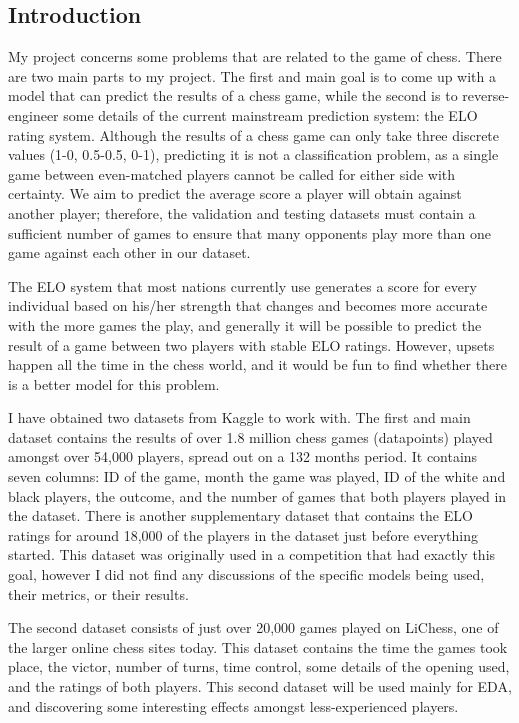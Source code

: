 \documentclass[12pt, letterpaper]{article}
\begin{document}
\begin{multicols}{2}
\raggedcolumns
\subsection*{Introduction}

My project concerns some problems that are related to the game of chess. There are two main parts to my project. The first and main goal is to come up with a model that can predict the results of a chess game, while the second is to reverse-engineer some details of the current mainstream prediction system: the ELO rating system.
Although the results of a chess game can only take three discrete values (1-0, 0.5-0.5, 0-1), predicting it is not a classification problem, as a single game between even-matched players cannot be called for either side with certainty. We aim to predict the average score a player will obtain against another player; therefore, the validation and testing datasets must contain a sufficient number of games to ensure that many opponents play more than one game against each other in our dataset.

The ELO system that most nations currently use generates a score for every individual based on his/her strength that changes and becomes more accurate with the more games the play, and generally it will be possible to predict the result of a game between two players with stable ELO ratings. However, upsets happen all the time in the chess world, and it would be fun to find whether there is a better model for this problem.

I have obtained two datasets from Kaggle to work with. The first and main dataset contains the results of over 1.8 million chess games (datapoints) played amongst over 54,000 players, spread out on a 132 months period. It contains seven columns: ID of the game, month the game was played, ID of the white and black players, the outcome, and the number of games that both players played in the dataset. There is another supplementary dataset that contains the ELO ratings for around 18,000 of the players in the dataset just before everything started. This dataset was originally used in a competition that had exactly this goal, however I did not find any discussions of the specific models being used, their metrics, or their results.

The second dataset consists of just over 20,000 games played on LiChess, one of the larger online chess sites today. This dataset contains the time the games took place, the victor, number of turns, time control, some details of the opening used, and the ratings of both players. This second dataset will be used mainly for EDA, and discovering some interesting effects amongst less-experienced players.


\end{multicols}
\end{document}

